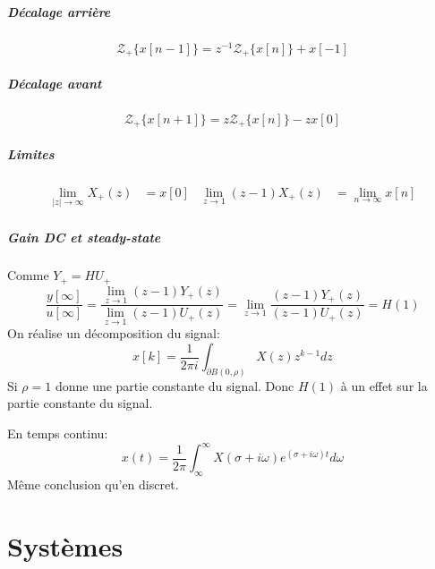 \documentclass{report}
\begin{document}
\subsubsection{Décalage arrière}
\begin{equation}
\mathcal{Z}_+ \{x[n-1]\} = z^{-1} \mathcal{Z}_+ \{x[n]\} + x[-1]
\end{equation}

\subsubsection{Décalage avant}
\begin{equation}
\mathcal{Z}_+ \{x[n+1]\} = z \mathcal{Z}_+ \{x[n]\} - zx[0]
\end{equation}

\subsubsection{Limites}
\begin{align*}
\lim_{|z| \rightarrow \infty} X_+(z) &= x[0] & \lim_{z\rightarrow 1}(z-1) X_+(z) &= \lim_{n \rightarrow \infty} x[n]
\end{align*}

\subsubsection{Gain DC et steady-state}
Comme $Y_+ = HU_+$
\begin{equation}
\frac{y[\infty]}{u[\infty]} = \frac{\lim_{z\rightarrow 1}(z-1) Y_+(z)}{\lim_{z\rightarrow 1}(z-1) U_+(z)} = \lim_{z \rightarrow 1} \frac{(z-1) Y_+(z)}{(z-1) U_+(z)} = H(1)
\end{equation}
On réalise un décomposition du signal:
\begin{equation}
x[k] = \frac{1}{2 \pi i} \int_{\partial B(0, \rho)} X(z) z^{k-1} dz
\end{equation}
Si $\rho = 1$ donne une partie constante du signal. Donc $H(1)$ à un effet sur la partie constante du signal.
\par En temps continu:
\begin{equation}
x(t) = \frac{1}{2 \pi} \int_{\infty}^{\infty} X( \sigma + i \omega) e^{(\sigma + i \omega) t} d \omega
\end{equation}
Même conclusion qu'en discret.



\part{Systèmes}
\end{document}
